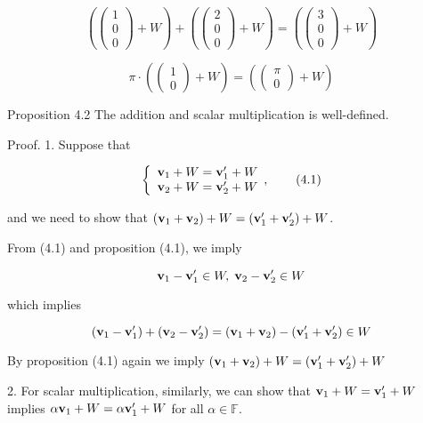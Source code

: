 \documentclass[11pt]{article}
\begin{document}
\[
\left( {\left( \begin{array}{l} 1 \\  0 \\  0 \end{array}\right)  + W}\right)  + \left( {\left( \begin{array}{l} 2 \\  0 \\  0 \end{array}\right)  + W}\right)  = \left( {\left( \begin{array}{l} 3 \\  0 \\  0 \end{array}\right)  + W}\right)
\]

\[
\pi  \cdot  \left( {\left( \begin{array}{l} 1 \\  0 \end{array}\right)  + W}\right)  = \left( {\left( \begin{array}{l} \pi \\  0 \end{array}\right)  + W}\right)
\]

Proposition 4.2 The addition and scalar multiplication is well-defined.

Proof. 1. Suppose that

\[
\left\{  {\begin{array}{l} {\bf v}_1 + W = {\bf v}_1^{\prime } + W \\  {\bf v}_2 + W = {\bf v}_2^{\prime } + W \end{array},}\right.  \tag{4.1}
\]

and we need to show that \(\left( {{\bf v}_1 + {\bf v}_2}\right)  + W = \left( {{\bf v}_1^{\prime } + {\bf v}_2^{\prime }}\right)  + W\).

From (4.1) and proposition (4.1), we imply

\[
{\bf v}_1 - {\bf v}_1^{\prime } \in  W,\;{\bf v}_2 - {\bf v}_2^{\prime } \in  W
\]

which implies

\[
\left( {{\bf v}_1 - {\bf v}_1^{\prime }}\right)  + \left( {{\bf v}_2 - {\bf v}_2^{\prime }}\right)  = \left( {{\bf v}_1 + {\bf v}_2}\right)  - \left( {{\bf v}_1^{\prime } + {\bf v}_2^{\prime }}\right)  \in  W
\]

By proposition (4.1) again we imply \(\left( {{\bf v}_1 + {\bf v}_2}\right)  + W = \left( {{\bf v}_1^{\prime } + {\bf v}_2^{\prime }}\right)  + W\)

2. For scalar multiplication, similarly, we can show that \({\bf v}_1 + W = {\bf v}_1^{\prime } + W\) implies \(\alpha {\bf v}_1 + W = \alpha {\bf v}_1^{\prime } + W\) for all \(\alpha  \in  \mathbb{F}\).
\end{document}
